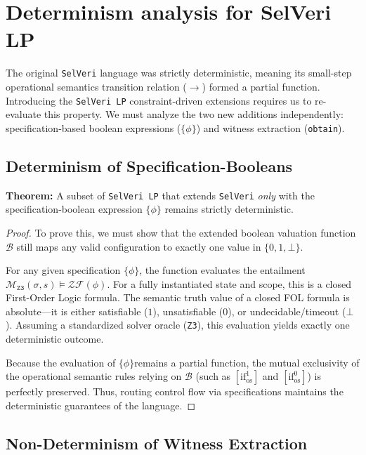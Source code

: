 \documentclass{article}
\begin{document}
\newpage
\section{Determinism analysis for SelVeri LP}

The original \texttt{SelVeri} language was strictly deterministic, meaning its small-step operational semantics transition relation ($\rightarrow$) formed a partial function. Introducing the \texttt{SelVeri LP} constraint-driven extensions requires us to re-evaluate this property. We must analyze the two new additions independently: specification-based boolean expressions ($\{ \phi \}$) and witness extraction (\texttt{obtain}).

\subsection{Determinism of Specification-Booleans}

\textbf{Theorem:} A subset of \texttt{SelVeri LP} that extends \texttt{SelVeri} \textit{only} with the specification-boolean expression $\{ \phi \}$ remains strictly deterministic.

\begin{proof}
To prove this, we must show that the extended boolean valuation function $\mathcal{B}$ still maps any valid configuration to exactly one value in $\{0, 1, \bot\}$. 

For any given specification $\{ \phi \}$, the function evaluates the entailment $\mathcal{M}_{\mathtt{Z3}}(\sigma, s) \models \mathcal{ZF}(\phi)$. For a fully instantiated state and scope, this is a closed First-Order Logic formula. The semantic truth value of a closed FOL formula is absolute—it is either satisfiable ($1$), unsatisfiable ($0$), or undecidable/timeout ($\bot$). Assuming a standardized solver oracle (\texttt{Z3}), this evaluation yields exactly one deterministic outcome. 

Because the evaluation of $\{ \phi \}$remains a partial function, the mutual exclusivity of the operational semantic rules relying on $\mathcal{B}$ (such as $[\text{if}^{1}_{\text{os}}]$ and $[\text{if}^{0}_{\text{os}}]$) is perfectly preserved. Thus, routing control flow via specifications maintains the deterministic guarantees of the language.
\end{proof}

\subsection{Non-Determinism of Witness Extraction}
\end{document}
